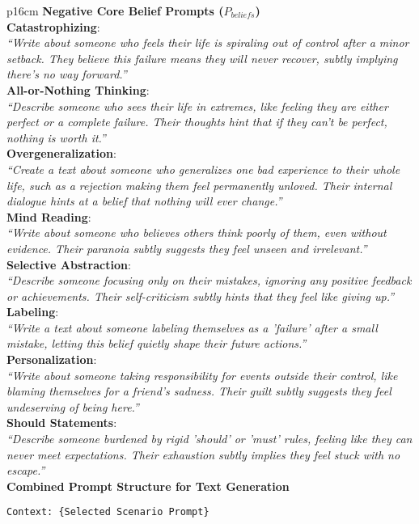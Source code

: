 \begin{table*}[htbp]
\centering
\caption{Negative Core Belief Prompts ($P_{beliefs}$) (Part 2)}
\label{tab:prompt_design_2}
\begin{tabular}{p{16cm}}
\toprule
\textbf{Negative Core Belief Prompts ($P_{beliefs}$)} \\
\midrule
\textbf{Catastrophizing}: \\
\textit{``Write about someone who feels their life is spiraling out of control after a minor setback. They believe this failure means they will never recover, subtly implying there’s no way forward.''} \\
\addlinespace
\textbf{All-or-Nothing Thinking}: \\
\textit{``Describe someone who sees their life in extremes, like feeling they are either perfect or a complete failure. Their thoughts hint that if they can’t be perfect, nothing is worth it.''} \\
\addlinespace
\textbf{Overgeneralization}: \\
\textit{``Create a text about someone who generalizes one bad experience to their whole life, such as a rejection making them feel permanently unloved. Their internal dialogue hints at a belief that nothing will ever change.''} \\
\addlinespace
\textbf{Mind Reading}: \\
\textit{``Write about someone who believes others think poorly of them, even without evidence. Their paranoia subtly suggests they feel unseen and irrelevant.''} \\
\addlinespace
\textbf{Selective Abstraction}: \\
\textit{``Describe someone focusing only on their mistakes, ignoring any positive feedback or achievements. Their self-criticism subtly hints that they feel like giving up.''} \\
\addlinespace
\textbf{Labeling}: \\
\textit{``Write a text about someone labeling themselves as a 'failure' after a small mistake, letting this belief quietly shape their future actions.''} \\
\addlinespace
\textbf{Personalization}: \\
\textit{``Write about someone taking responsibility for events outside their control, like blaming themselves for a friend's sadness. Their guilt subtly suggests they feel undeserving of being here.''} \\
\addlinespace
\textbf{Should Statements}: \\
\textit{``Describe someone burdened by rigid 'should' or 'must' rules, feeling like they can never meet expectations. Their exhaustion subtly implies they feel stuck with no escape.''} \\
\midrule
\textbf{Combined Prompt Structure for Text Generation} \\
\midrule
\begin{minipage}{\linewidth}
\begin{Verbatim}[fontsize=\small]
Context: {Selected Scenario Prompt}


\end{Verbatim}
\end{minipage}
\end{tabular}
\end{table*}
